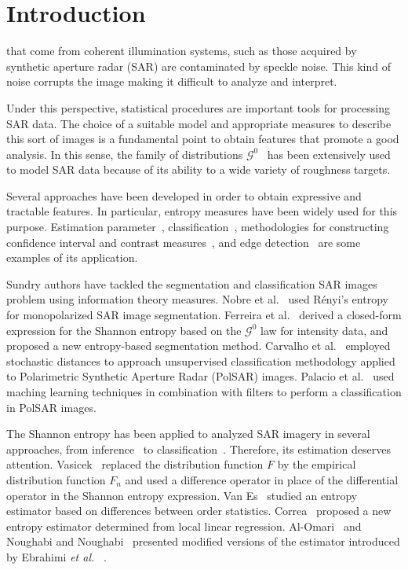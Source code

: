 \documentclass[journal]{IEEEtran}
\begin{document}
	\IEEEpeerreviewmaketitle
	
	\section{Introduction}
	\label{intro}
	 that come from coherent illumination systems, such as those acquired by synthetic aperture radar (SAR) are contaminated by speckle noise. 
	This kind of noise corrupts the image making it difficult to analyze and interpret. 
	
	Under this perspective, statistical procedures are important tools for processing SAR data. 
	The choice of a suitable model and appropriate measures to describe this sort of images is a fundamental point to obtain features that promote a good analysis. In this sense, the family of distributions $\mathcal{G}^0$~\cite{Frery97} has been extensively used to model SAR data because of its ability to a wide variety of roughness targets. 
    
	Several approaches have been developed in order to obtain expressive and tractable features. 
	In particular, entropy measures have been widely used for this purpose. 
	Estimation parameter~\cite{gambini2015}, classification~\cite{Carvalho2019}, methodologies for constructing
	confidence interval and contrast measures~\cite{Frery2012,Nascimento2009}, and edge detection~\cite{Nascimento2014} are some examples of its application.
	
	Sundry authors have tackled the segmentation and classification SAR images problem using information theory measures. 
	Nobre et al.~\cite{Nobre2016} used Rényi's entropy for monopolarized SAR image segmentation.
	Ferreira et al.~\cite{Ferreira2020} derived a closed-form expression for the Shannon entropy based on the $\mathcal{G}^0$ law for intensity data, and proposed a new entropy-based segmentation method. 
	Carvalho et al.~\cite{Carvalho2019} employed stochastic distances to approach unsupervised classification methodology applied to Polarimetric Synthetic Aperture Radar (PolSAR) images. Palacio et al.~\cite{Palacio2019} used maching learning techniques in combination with filters to perform a classification in PolSAR images.
	
	The Shannon entropy has been applied to analyzed SAR imagery in several approaches, from inference~\cite{Frery2012} to classification~\cite{Ferreira2020}. 
	Therefore, its estimation deserves attention. 
	Vasicek~\cite{Vasicek76} replaced the distribution function $F$ by the empirical distribution function $F_n$ and used a difference operator in place of the differential operator in the Shannon entropy expression. 
	Van Es~\cite{VanEs92} studied an entropy estimator based on differences between order statistics. 
	Correa~\cite{Correa95} proposed a new entropy estimator determined from local linear regression.
	Al-Omari~\cite{AlOmari2016} and Noughabi and Noughabi~\cite{Noughabi13} presented modified versions of the estimator introduced by Ebrahimi \emph{et al.}~\cite{Ebrahimi94} .
	
\end{document}
